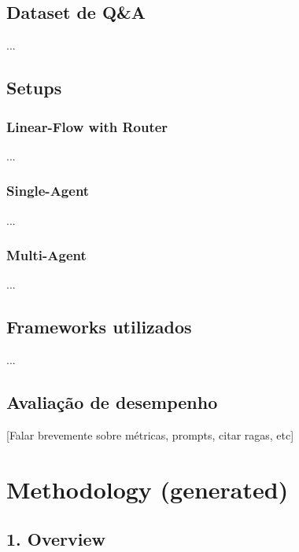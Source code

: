         \subsection{Dataset de Q\&A}

            ...
        
        \subsection{Setups}
        
            \subsubsection{Linear-Flow with Router}        
                ...
            
            \subsubsection{Single-Agent}        
                ...
            
            \subsubsection{Multi-Agent}        
                ...
            
        \subsection{Frameworks utilizados}
        
            ...
            
        \subsection{Avaliação de desempenho}

            [Falar brevemente sobre métricas, prompts, citar ragas, etc]
            



    \section{Methodology (generated)}

        \subsection{1. Overview}

